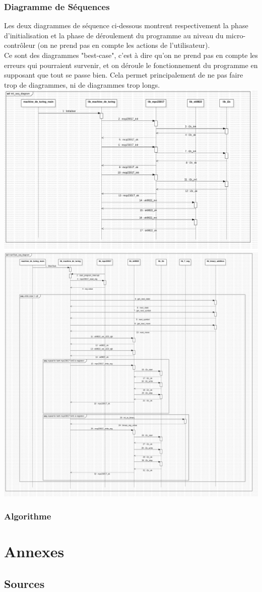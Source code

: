 \documentclass[12pt]{report}
\begin{document}
	\subsubsection{Diagramme de Séquences}
	Les deux diagrammes de séquence ci-dessous montrent respectivement la phase d'initialisation et la phase de déroulement du programme au niveau du micro-contrôleur (on ne prend pas en compte les actions de l'utilisateur).\\
	Ce sont des diagrammes "best-case", c'est à dire qu'on ne prend pas en compte les erreurs qui pourraient survenir, et on déroule le fonctionnement du programme en supposant que tout se passe bien. Cela permet principalement de ne pas faire trop de diagrammes, ni de diagrammes trop longs.\\
	\includegraphics[width=\textwidth]{img/initSeq}
	\includegraphics[width=\textwidth]{img/mainTaskSeq}
	\subsubsection{Algorithme}
	\section{Annexes}
	\subsection{Sources}
\end{document}

